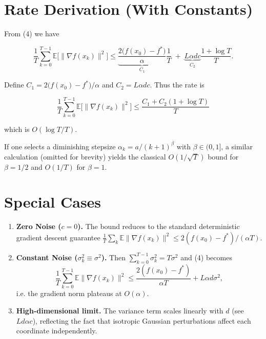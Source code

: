 \documentclass{article}
\newcommand{\E}{\mathbb{E}}
\begin{document}
\section*{Rate Derivation (With Constants)}
From (4) we have  

\[
\frac{1}{T}\sum_{k=0}^{T-1}\E\!\bigl[\|\nabla f(x_{k})\|^{2}\bigr]
\le
\underbrace{\frac{2\bigl(f(x_{0})-f^{*}\bigr)}{\alpha}}_{\displaystyle C_{1}}
\frac{1}{T}
\;+\;
\underbrace{L\alpha d c}_{\displaystyle C_{2}}\frac{1+\log T}{T}.
\]

Define $C_{1}=2\bigl(f(x_{0})-f^{*}\bigr)/\alpha$ and $C_{2}=L\alpha d c$.
Thus the rate is  

\[
\boxed{
\frac{1}{T}\sum_{k=0}^{T-1}\E\!\bigl[\|\nabla f(x_{k})\|^{2}\bigr]
\le \frac{C_{1}+C_{2}(1+\log T)}{T}
}
\tag{R1}
\]

which is $O(\log T/T)$.

If one selects a diminishing stepsize $\alpha_{k}=a/(k+1)^{\beta}$ with
$\beta\in(0,1]$, a similar calculation (omitted for brevity) yields the
classical $O(1/\sqrt{T})$ bound for $\beta=1/2$ and $O(1/T)$ for $\beta=1$.

\section*{Special Cases}
\begin{enumerate}[label=(\alph*)]
\item \textbf{Zero Noise ($c=0$).} The bound reduces to the standard
deterministic gradient descent guarantee
$\frac{1}{T}\sum_{k}\E\|\nabla f(x_{k})\|^{2}\le 2(f(x_{0})-f^{*})/(\alpha T)$.

\item \textbf{Constant Noise ($\sigma_{k}^{2}\equiv\sigma^{2}$).}
Then $\sum_{k=0}^{T-1}\sigma_{k}^{2}=T\sigma^{2}$ and (4) becomes
\[
\frac{1}{T}\sum_{k=0}^{T-1}\E\|\nabla f(x_{k})\|^{2}
\le\frac{2(f(x_{0})-f^{*})}{\alpha T}+L\alpha d\sigma^{2},
\]
i.e. the gradient norm plateaus at $O(\alpha)$.

\item \textbf{High‑dimensional limit.} The variance term scales linearly
with $d$ (see $Ld\alpha c$), reflecting the fact that isotropic Gaussian
perturbations affect each coordinate independently.
\end{enumerate}

\end{document}
